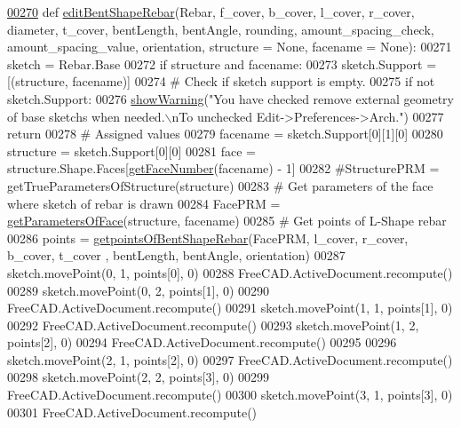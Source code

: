 \begin{DoxyCode}
\hypertarget{namespaceBentShapeRebar.tex_l00270}{}\hyperlink{namespaceBentShapeRebar_a941d005845cd497c0beb12bb8fef9171}{00270} \textcolor{keyword}{def }\hyperlink{namespaceBentShapeRebar_a941d005845cd497c0beb12bb8fef9171}{editBentShapeRebar}(Rebar, f\_cover, b\_cover, l\_cover, r\_cover, diameter, t\_cover, 
      bentLength, bentAngle, rounding, amount\_spacing\_check, amount\_spacing\_value, orientation, structure = None, 
      facename = None):
00271     sketch = Rebar.Base
00272     \textcolor{keywordflow}{if} structure \textcolor{keywordflow}{and} facename:
00273         sketch.Support = [(structure, facename)]
00274     \textcolor{comment}{# Check if sketch support is empty.}
00275     \textcolor{keywordflow}{if} \textcolor{keywordflow}{not} sketch.Support:
00276         \hyperlink{namespaceRebarfunc_a2278a0602d46a62953af1fcf2e574a94}{showWarning}(\textcolor{stringliteral}{"You have checked remove external geometry of base sketchs when needed.\(\backslash\)nTo
       unchecked Edit->Preferences->Arch."})
00277         \textcolor{keywordflow}{return}
00278     \textcolor{comment}{# Assigned values}
00279     facename = sketch.Support[0][1][0]
00280     structure = sketch.Support[0][0]
00281     face = structure.Shape.Faces[\hyperlink{namespaceRebarfunc_a3885b3b63e3a41508ac79bc7550cf301}{getFaceNumber}(facename) - 1]
00282     \textcolor{comment}{#StructurePRM = getTrueParametersOfStructure(structure)}
00283     \textcolor{comment}{# Get parameters of the face where sketch of rebar is drawn}
00284     FacePRM = \hyperlink{namespaceRebarfunc_a92122b3d7cedd3d47bb63380a5ac4d08}{getParametersOfFace}(structure, facename)
00285     \textcolor{comment}{# Get points of L-Shape rebar}
00286     points = \hyperlink{namespaceBentShapeRebar_a33951a8ab21a73bae42af9f81d7c43c3}{getpointsOfBentShapeRebar}(FacePRM, l\_cover, r\_cover, b\_cover, t\_cover
      , bentLength, bentAngle, orientation)
00287     sketch.movePoint(0, 1, points[0], 0)
00288     FreeCAD.ActiveDocument.recompute()
00289     sketch.movePoint(0, 2, points[1], 0)
00290     FreeCAD.ActiveDocument.recompute()
00291     sketch.movePoint(1, 1, points[1], 0)
00292     FreeCAD.ActiveDocument.recompute()
00293     sketch.movePoint(1, 2, points[2], 0)
00294     FreeCAD.ActiveDocument.recompute()
00295 
00296     sketch.movePoint(2, 1, points[2], 0)
00297     FreeCAD.ActiveDocument.recompute()
00298     sketch.movePoint(2, 2, points[3], 0)
00299     FreeCAD.ActiveDocument.recompute()
00300     sketch.movePoint(3, 1, points[3], 0)
00301     FreeCAD.ActiveDocument.recompute()

\end{DoxyCode}
